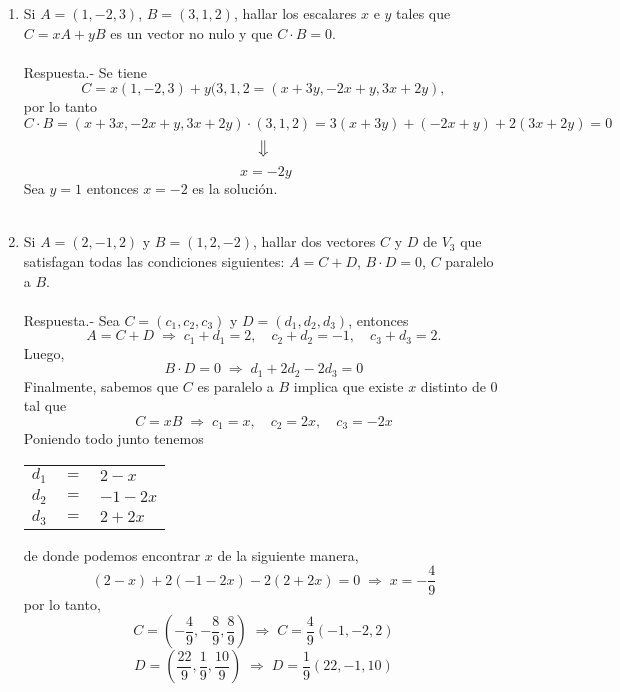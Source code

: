 \begin{enumerate}[\bfseries 1.]
\item Si $A = (1,-2,3)$, $B=(3,1,2)$, hallar los escalares $x$ e $y$ tales que $C = xA + yB$ es un vector no nulo y que $C\cdot B = 0$.\\\\
    Respuesta.-\; Se tiene $$C = x(1,-2,3) + y(3,1,2 = (x+3y,-2x+y,3x+2y),$$ por lo tanto $$C\cdot B = (x+3x,-2x+y,3x+2y)\cdot (3,1,2) = 3(x+3y)+(-2x+y)+2(3x+2y) = 0 $$ $$\big\Downarrow$$ $$\; x = -2y$$ 
    Sea $y=1$ entonces $x=-2$ es la solución.\\\\

\item Si $A=(2,-1,2)$ y $B=(1,2,-2)$, hallar dos vectores $C$ y $D$ de $V_3$ que satisfagan todas las condiciones siguientes: $A=C+D$, $B\cdot D = 0$, $C$ paralelo a $B$.\\\\
    Respuesta.-\;  Sea $C=(c_1,c_2,c_3)$ y $D=(d_1,d_2,d_3)$, entonces $$A=C+D \;  \Longrightarrow\; c_1+d_1=2, \quad c_2+d_2=-1, \quad c_3+d_3 = 2.$$
    Luego, $$B\cdot D = 0\; \Longrightarrow \; d_1+2d_2-2d_3=0$$
    Finalmente, sabemos que $C$ es paralelo a $B$ implica que existe $x$ distinto de $0$ tal que 
    $$C=xB \; \Longrightarrow \; c_1=x, \quad c_2=2x, \quad c_3 = -2x$$
    Poniendo todo junto tenemos 
    \begin{center}
	\begin{tabular}{rcl}
	    $d_1$&$=$&$2-x$\\
	    $d_2$&$=$&$-1-2x$\\
	    $d_3$&$=$&$2+2x$\\
	\end{tabular}
    \end{center}
     de donde podemos encontrar $x$ de la siguiente manera,
     $$(2-x)+2(-1-2x)-2(2+2x)=0 \; \Longrightarrow\; x=-\dfrac{4}{9}$$
     por lo tanto, $$C=\left(-\dfrac{4}{9},-\dfrac{8}{9},\dfrac{8}{9}\right) \; \Longrightarrow \;  C=\dfrac{4}{9}(-1,-2,2)$$ $$D=\left(\dfrac{22}{9},\dfrac{1}{9},\dfrac{10}{9} \right) \; \Longrightarrow \; D=\dfrac{1}{9}(22,-1,10)$$\\


\end{enumerate}
